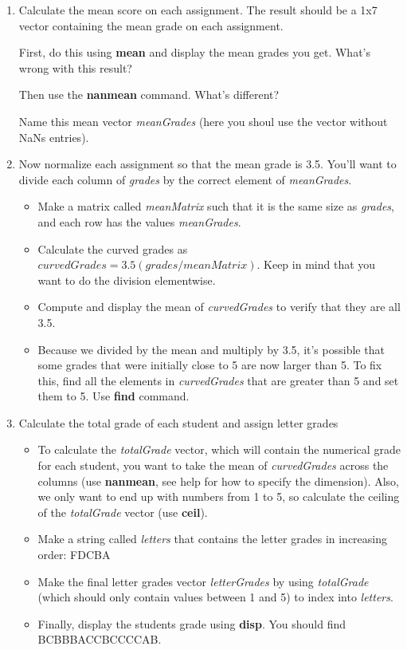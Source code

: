 \documentclass[12pt]{TDTP}
\begin{document}
\begin{enumerate}
\item Calculate the mean score on each assignment. The result should be a 1x7 vector containing the mean grade on each assignment.

First, do this using \textbf{mean} and display the mean grades you get. What's wrong with this result?

Then use the \textbf{nanmean} command. What's different?

Name this mean vector \emph{meanGrades} (here you shoul use the vector without NaNs entries).

\item Now normalize each assignment so that the mean grade is 3.5. You'll want to divide each column of \emph{grades} by the correct element of \emph{meanGrades}.
\begin{itemize}
\item Make a matrix called \emph{meanMatrix} such that it is the same size as \emph{grades}, and each row has the values \emph{meanGrades}. 
\item Calculate the curved grades as $curvedGrades = 3.5 (grades/meanMatrix)$.
Keep in mind that you want to do the division elementwise.
\item Compute and display the mean of \emph{curvedGrades} to verify that they are all 3.5.
\item Because we divided by the mean and multiply by 3.5, it's possible that some grades that were initially close to 5 are now larger than 5.
To fix this, find all the elements in \emph{curvedGrades} that are greater than 5 and set them to 5. Use \textbf{find} command.
\end{itemize}

\item Calculate the total grade of each student and assign letter grades
\begin{itemize}
\item To calculate the \textit{totalGrade} vector, which will contain the numerical grade for each student, you want to take the mean of \textit{curvedGrades} across the columns (use \textbf{nanmean}, see help for how to specify the dimension). 
Also, we only want to end up with numbers from 1 to 5, so calculate the ceiling of the \textit{totalGrade} vector (use \textbf{ceil}).

\item Make a string called \textit{letters} that contains the letter grades in increasing order: FDCBA

\item Make the final letter grades vector \textit{letterGrades} by using \textit{totalGrade} (which should only contain values between 1 and 5) to index into \textit{letters}.

\item Finally, display the students grade using \textbf{disp}. You should find BCBBBACCBCCCCAB.
\end{itemize}
\end{enumerate}

\end{document}
